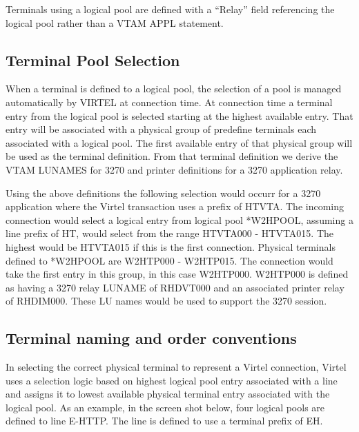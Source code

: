 \documentclass[letterpaper,10pt,english]{sphinxmanual}
\begin{document}

Terminals using a logical pool are defined with a “Relay” field referencing the logical pool rather than a VTAM APPL statement.

\ignorespaces 

\subsection{Terminal Pool Selection}
\label{\detokenize{connectivity_guide:terminal-pool-selection}}\label{\detokenize{connectivity_guide:index-143}}
When a terminal is defined to a logical pool, the selection of a pool is managed automatically by VIRTEL at connection time. At connection time a terminal entry from the logical pool is selected starting at the highest available entry. That entry will be associated with a physical group of predefine terminals each associated with a logical pool. The first available entry of that physical group will be used as the terminal definition. From that terminal definition we derive the VTAM LUNAMES for 3270 and printer definitions for a 3270 application relay.

Using the above definitions the following selection would occurr for a 3270 application where the Virtel transaction uses a prefix of HTVTA. The incoming connection would select a logical entry from logical pool *W2HPOOL, assuming a line prefix of HT, would select from the range HTVTA000 - HTVTA015. The highest would be HTVTA015 if this is the first connection. Physical terminals defined to *W2HPOOL are W2HTP000 - W2HTP015. The connection would take the first entry in this group, in this case W2HTP000. W2HTP000 is defined as having a 3270 relay LUNAME of RHDVT000 and an associated printer relay of RHDIM000. These LU names would be used to support the 3270 session.


\subsection{Terminal naming and order conventions}
\label{\detokenize{connectivity_guide:terminal-naming-and-order-conventions}}
In selecting the correct physical terminal to represent a Virtel connection, Virtel uses a selection logic based on highest logical pool entry associated with a line and assigns it to lowest available physical terminal entry associated with the logical pool. As an example, in the screen shot below, four logical pools are defined to line E-HTTP. The line is defined to use a terminal prefix of EH.
\end{document}
